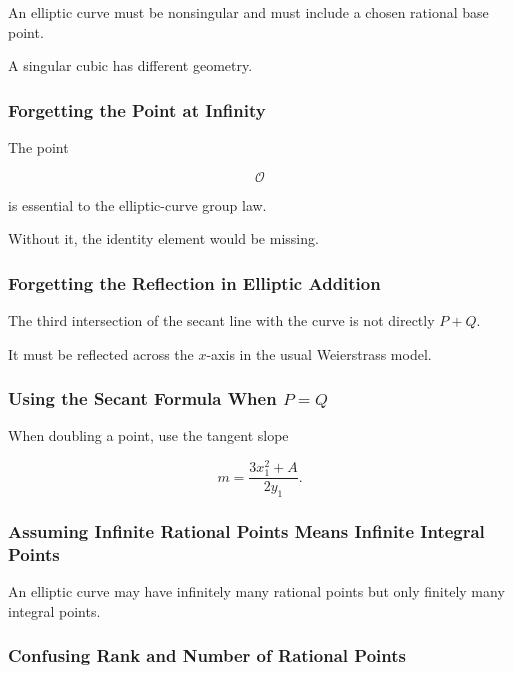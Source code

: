 An elliptic curve must be nonsingular and must include a chosen rational
base point.

A singular cubic has different geometry.

\subsubsection{Forgetting the Point at Infinity}

The point

\[ \mathcal O \]

is essential to the elliptic-curve group law.

Without it, the identity element would be missing.

\subsubsection{Forgetting the Reflection in Elliptic Addition}

The third intersection of the secant line with the curve is not directly
\(P+Q\).

It must be reflected across the \(x\)-axis in the usual Weierstrass model.

\subsubsection{Using the Secant Formula When \(P=Q\)}

When doubling a point, use the tangent slope

\[ m=\frac{3x_1^2+A}{2y_1}. \]

\subsubsection{Assuming Infinite Rational Points Means Infinite Integral Points}

An elliptic curve may have infinitely many rational points but only finitely
many integral points.

\subsubsection{Confusing Rank and Number of Rational Points}

